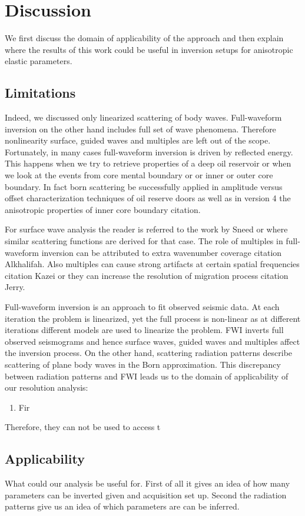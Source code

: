 \section{Discussion}
We first discuss the domain of applicability of the approach and then explain where the results of this work could be useful in inversion setups for anisotropic elastic parameters.

\subsection{Limitations}
Indeed, we discussed only linearized scattering of body waves. Full-waveform inversion on the other hand includes full set of wave phenomena. Therefore nonlinearity surface, guided waves and multiples are left out of the scope. Fortunately, in many cases full-waveform inversion is driven by reflected energy. This happens when we try to retrieve properties of a deep oil reservoir or when we look at the events from core mental boundary or or inner or outer core boundary. In fact born scattering be successfully applied in amplitude versus offset characterization techniques of oil reserve doors as well as in version 4 the anisotropic properties of inner core boundary citation.



For surface wave analysis the reader is referred to the work by Sneed or where similar scattering functions are derived for that case. The role of multiples in full-waveform inversion can be attributed to extra wavenumber coverage citation Alkhalifah. Also multiples can cause strong artifacts at certain spatial frequencies citation Kazei or they can increase the resolution of migration process citation Jerry.









Full-waveform inversion is an approach to fit observed seismic data. At each iteration the problem is linearized, yet the full process is non-linear as at different iterations different models are used to linearize the problem. FWI inverts full observed seismograms and hence surface waves, guided waves and multiples affect the inversion process. On the other hand, scattering radiation patterns describe scattering of plane body waves in the Born approximation. This discrepancy between radiation patterns and FWI leads us to the domain of applicability of our resolution analysis:
 
\begin{enumerate}
  \item Fir 
\end{enumerate}

Therefore, they can not be used to access t


\subsection{Applicability}
What could our analysis be useful for. First of all it gives an idea of how many parameters can be inverted given and acquisition set up. Second the radiation patterns give us an idea of which parameters are can be inferred.

